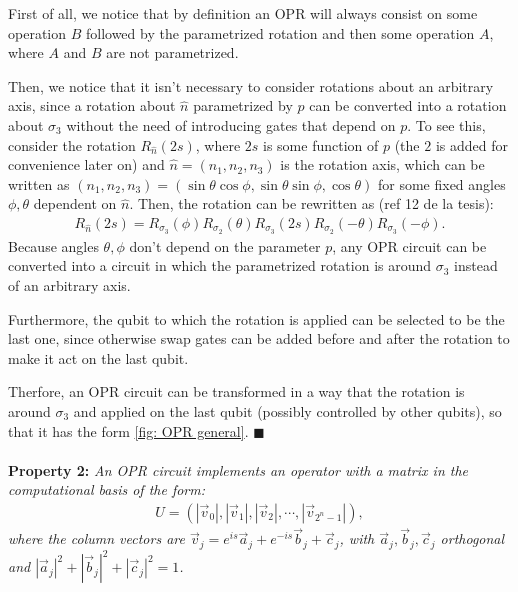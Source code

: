 First of all, we notice that by definition an OPR
will always consist on some operation $B$ followed by the parametrized rotation 
and then some operation $A$, where $A$ and $B$ are not parametrized. 

Then, we notice that it isn't necessary to consider rotations
about an arbitrary axis, since a rotation about $\hat{n}$ parametrized by $p$ can
be converted into a rotation about $\sigma_3$ without the need of introducing gates that depend on $p$.
To see this, consider the rotation $R_{\hat{n}}(2s)$, where $2s$ is some function of $p$ (the $2$ is added for convenience later on) and $\hat{n} = (n_1,n_2,n_3)$ is the rotation axis,
 which can be written as $(n_1,n_2,n_3) = (\sin \theta \cos \phi , \sin \theta\sin \phi, \cos \theta)$ for some fixed angles $\phi, \theta$ dependent on $\hat{n}$. 
 Then, the rotation can be rewritten as (ref 12 de la tesis):
\begin{eqnarray}
R_{\hat{n}}(2s) = R_{\sigma_3}(\phi) R_{\sigma_2}(\theta) R_{\sigma_3}(2s) R_{\sigma_2}(-\theta) R_{\sigma_3}(-\phi).
\end{eqnarray}
Because angles $\theta, \phi$ don't depend on the parameter $p$, 
any OPR circuit can be converted into a circuit in which the parametrized rotation is around $\sigma_3$ instead of an arbitrary axis.

Furthermore, the qubit to which the rotation is applied can be selected to be the last one,
since otherwise  swap gates can be added before and after the rotation to make it act on the last qubit.

Therfore, an OPR circuit can be transformed in a way that the rotation is around $\sigma_3$ and applied on the last qubit 
(possibly controlled by other qubits), 
so that it has the form \ref{fig: OPR general}. $\blacksquare$ \\ \\

\textbf{Property 2:} \textit{An OPR circuit implements an operator with a matrix in the computational basis of the form:}
\begin{eqnarray}
U = (|\vec{v}_0|, |\vec{v}_1|, |\vec{v}_2|, \cdots, |\vec{v}_{2^n-1}|),
\end{eqnarray}
\textit{where the column vectors are $\vec{v}_j = e^{is} \vec{a}_j + e^{-is} \vec{b}_j + \vec{c}_j$,
with $\vec{a}_j ,\vec{b}_j, \vec{c}_j$ orthogonal and $|\vec{a}_j|^2 + |\vec{b}_j|^2 + |\vec{c}_j|^2 = 1$.}\\

